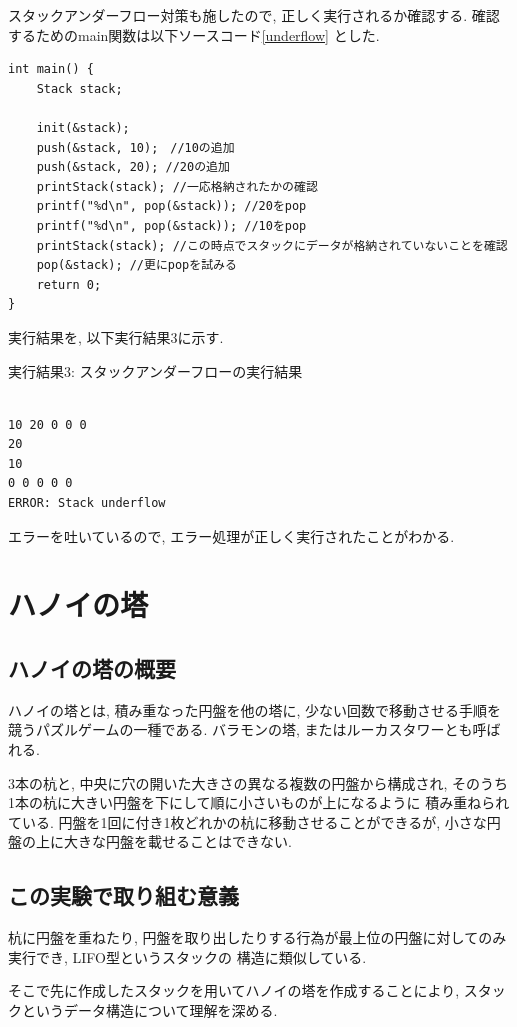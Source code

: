\documentclass[a4j]{jsarticle}
\begin{document}
スタックアンダーフロー対策も施したので, 正しく実行されるか確認する. 確認するためのmain関数は以下ソースコード\ref{underflow}
とした. 
\begin{lstlisting}[label = underflow, caption = スタックアンダーフロー動作確認のためのmain関数]
int main() {
	Stack stack;

	init(&stack);
	push(&stack, 10);　//10の追加
	push(&stack, 20); //20の追加
	printStack(stack); //一応格納されたかの確認
	printf("%d\n", pop(&stack)); //20をpop
	printf("%d\n", pop(&stack)); //10をpop
	printStack(stack); //この時点でスタックにデータが格納されていないことを確認
	pop(&stack); //更にpopを試みる
	return 0;
}
\end{lstlisting}
実行結果を, 以下実行結果3に示す. 
\begin{breakitembox}[l]{実行結果3: スタックアンダーフローの実行結果}
\begin{verbatim}

10 20 0 0 0
20
10
0 0 0 0 0
ERROR: Stack underflow
\end{verbatim}
\end{breakitembox}
エラーを吐いているので, エラー処理が正しく実行されたことがわかる. 

\section{ハノイの塔}
    \subsection{ハノイの塔の概要}
        ハノイの塔とは, 積み重なった円盤を他の塔に, 少ない回数で移動させる手順を競うパズルゲームの一種である. 
        バラモンの塔, またはルーカスタワーとも呼ばれる. 
        
        3本の杭と, 中央に穴の開いた大きさの異なる複数の円盤から構成され, そのうち1本の杭に大きい円盤を下にして順に小さいものが上になるように
        積み重ねられている. 円盤を1回に付き1枚どれかの杭に移動させることができるが, 小さな円盤の上に大きな円盤を載せることはできない. 
    \subsection{この実験で取り組む意義}
        杭に円盤を重ねたり, 円盤を取り出したりする行為が最上位の円盤に対してのみ実行でき, LIFO型というスタックの
        構造に類似している. 
        
        そこで先に作成したスタックを用いてハノイの塔を作成することにより, スタックというデータ構造について理解を深める. 
\end{document}
